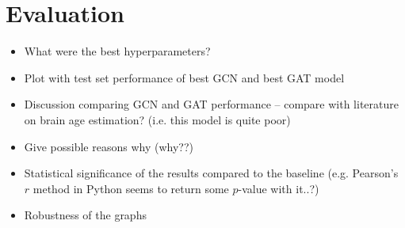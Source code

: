\chapter{Evaluation}


\begin{itemize}
    \item What were the best hyperparameters?
    \item Plot with test set performance of best GCN and best GAT model
    \item Discussion comparing GCN and GAT performance – compare with literature on brain age estimation? (i.e. this model is quite poor)
    \item Give possible reasons why (why??)
    \item Statistical significance of the results compared to the baseline (e.g. Pearson's $r$ method in Python seems to return some $p$-value with it..?)
    \item Robustness of the graphs
\end{itemize}





